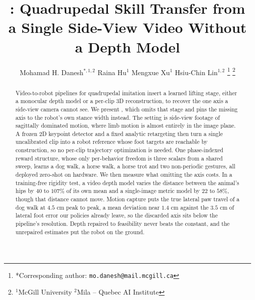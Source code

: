 \documentclass[letterpaper, 10 pt, conference]{ieeeconf}
\begin{document}
\title{\LARGE \bf
\ourMethod: Quadrupedal Skill Transfer from a Single Side-View Video Without a Depth Model
}


\author{
Mohamad H. Danesh$^{*,1,2}$
Raina Hu$^{1}$
Mengxue Xu$^{1}$
Hsiu-Chin Lin$^{1,2}$
\thanks{*Corresponding author: {\tt\small mo.danesh@mail.mcgill.ca}}
\thanks{$^{1}$McGill University \quad $^{2}$Mila -- Quebec AI Institute}
}

\maketitle
\thispagestyle{empty}
\pagestyle{empty}


\begin{abstract}
Video-to-robot pipelines for quadrupedal imitation insert a learned lifting stage, either a monocular depth model or a per-clip 3D reconstruction, to recover the one axis a side-view camera cannot see. We present \ourMethod, which omits that stage and pins the missing axis to the robot's own stance width instead. The setting is side-view footage of sagittally dominated motion, where limb motion is almost entirely in the image plane. A frozen 2D keypoint detector and a fixed analytic retargeting then turn a single uncalibrated clip into a robot reference whose foot targets are reachable by construction, so no per-clip trajectory optimization is needed. One phase-indexed reward structure, whose only per-behavior freedom is three scalars from a shared sweep, learns a dog walk, a horse walk, a horse trot and two non-periodic gestures, all deployed zero-shot on hardware. We then measure what omitting the axis costs. In a training-free rigidity test, a video depth model varies the distance between the animal's hips by $40$ to $107\%$ of its own mean and a single-image metric model by $22$ to $58\%$, though that distance cannot move. Motion capture puts the true lateral paw travel of a dog walk at $4.5$ cm peak to peak, a mean deviation near $1.4$ cm against the $3.5$ cm of lateral foot error our policies already leave, so the discarded axis sits below the pipeline's resolution. Depth repaired to feasibility never beats the constant, and the unrepaired estimates put the robot on the ground.
\end{abstract}
\end{document}
